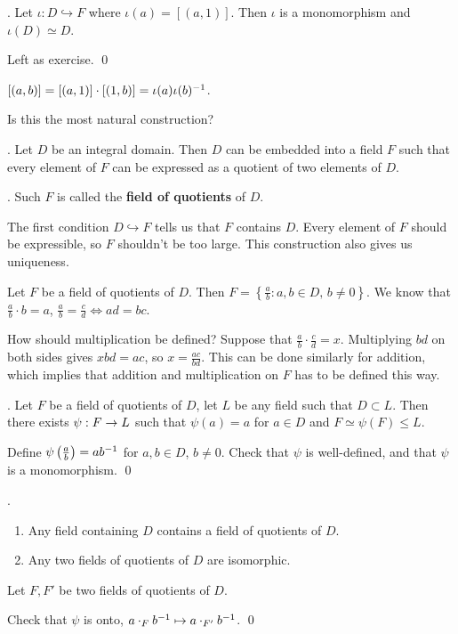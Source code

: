\lemma. Let \(\iota : D \hookrightarrow F\) where \(\iota(a) = [(a, 1)]\). Then \(\iota\) is a monomorphism and \(\iota(D) \simeq D\).

\pf Left as exercise. \qed

\rmk \([(a, b)] = [(a, 1)] \cdot [(1, b)] = \iota(a) \iota(b)^{-1}\).

Is this the most natural construction?

\thm. Let \(D\) be an integral domain. Then \(D\) can be embedded into a field \(F\) such that every element of \(F\) can be expressed as a quotient of two elements of \(D\).

.  Such \(F\) is called the \textbf{field of quotients} of \(D\).

\rmk The first condition \(D \hookrightarrow F\) tells us that \(F\) contains \(D\). Every element of \(F\) should be expressible, so \(F\) shouldn't be too large. This construction also gives us uniqueness.

Let \(F\) be a field of quotients of \(D\). Then \(F = \left\{\frac{a}{b} : a, b \in D,\, b \neq 0\right\}\). We know that \(\frac{a}{b} \cdot b = a\), \(\frac{a}{b} = \frac{c}{d} \iff ad = bc\).

How should multiplication be defined? Suppose that \(\frac{a}{b} \cdot \frac{c}{d} = x\). Multiplying \(bd\) on both sides gives \(xbd = ac\), so \(x = \frac{ac}{bd}\). This can be done similarly for addition, which implies that addition and multiplication on \(F\) has to be defined this way.

\thm. Let \(F\) be a field of quotients of \(D\), let \(L\) be any field such that \(D \subset L\). Then there exists \(\psi : F \rightarrow L\) such that \(\psi(a) = a\) for \(a \in D\) and \(F \simeq \psi(F) \leq L\).

\pf Define \(\psi\left( \frac{a}{b} \right) = ab^{-1}\) for \(a, b \in D\), \(b \neq 0\). Check that \(\psi\) is well-defined, and that \(\psi\) is a monomorphism. \qed

\cor.
\begin{enumerate}
    \item Any field containing \(D\) contains a field of quotients of \(D\).
    \item Any two fields of quotients of \(D\) are isomorphic.
\end{enumerate}

\pf {} Let \(F, F'\) be two fields of quotients of \(D\).
\begin{center}
\end{center}
Check that \(\psi\) is onto, \(a\cdot_F b^{-1} \mapsto a \cdot_{F'} b^{-1}\). \qed

\pagebreak

